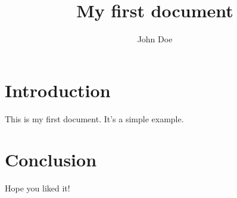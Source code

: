 \documentclass{article}
\begin{document}
\title{My first document}
\author{John Doe}
\maketitle
\section{Introduction}
This is my first document. It's a simple example.
\section{Conclusion}
Hope you liked it!
\end{document}
